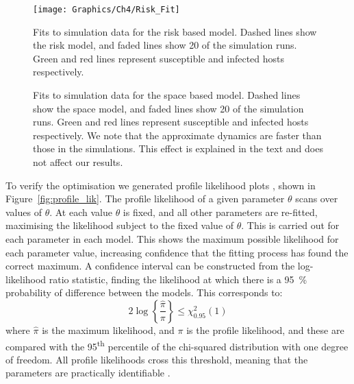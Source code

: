 \begin{figure}
    \begin{center}
        \texttt{[image: Graphics/Ch4/Risk\_Fit]}
        \caption[Risk based approximate model fitted to the network model]{Fits to simulation data for the risk based model. Dashed lines show the risk model, and faded lines show 20 of the simulation runs. Green and red lines represent susceptible and infected hosts respectively.}
        \label{fig:risk_fit}
    \end{center}
\end{figure}

\begin{figure}[h]
    \begin{center}
        \caption[Space based approximate model fitted to the network model]{Fits to simulation data for the space based model. Dashed lines show the space model, and faded lines show 20 of the simulation runs. Green and red lines represent susceptible and infected hosts respectively. We note that the approximate dynamics are faster than those in the simulations. This effect is explained in the text and does not affect our results.\label{fig:space_fit}}
    \end{center}
\end{figure}

To verify the optimisation we generated profile likelihood plots \citep{bolker_ecological_2008}, shown in Figure~\ref{fig:profile_lik}. The profile likelihood of a given parameter $\theta$ scans over values of $\theta$. At each value $\theta$ is fixed, and all other parameters are re-fitted, maximising the likelihood subject to the fixed value of $\theta$. This is carried out for each parameter in each model. This shows the maximum possible likelihood for each parameter value, increasing confidence that the fitting process has found the correct maximum. A confidence interval can be constructed from the log-likelihood ratio statistic, finding the likelihood at which there is a \SI{95}{\percent} probability of difference between the models. This corresponds to:
\begin{equation}
    2\log\left\{\frac{\hat{\pi}}{\pi}\right\} \leq \chi^2_{0.95}(1)
\end{equation}
where $\hat{\pi}$ is the maximum likelihood, and $\pi$ is the profile likelihood, and these are compared with the 95\textsuperscript{th} percentile of the chi-squared distribution with one degree of freedom. All profile likelihoods cross this threshold, meaning that the parameters are practically identifiable \citep{raue_structural_2009}.

